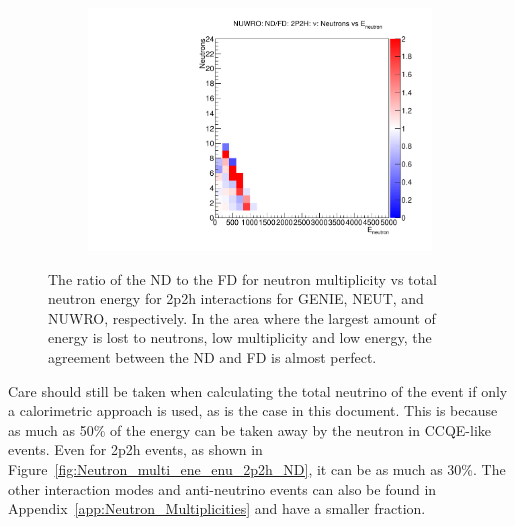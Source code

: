 \documentclass[12pt]{article}
\begin{document}
\begin{figure}
\begin{subfigure}[b]{0.32\textwidth}
  \includegraphics[width=\textwidth]{nneutrons_v_total_ene/Nneutrons_Total_ENe_2p2h_NUWRO_ND_FD_numu_norm.pdf}
\end{subfigure}
\caption{The ratio of the ND to the FD for neutron multiplicity vs total neutron energy for 2p2h interactions for GENIE, NEUT, and NUWRO, respectively.  In the area where the largest amount of energy is lost to neutrons, low multiplicity and low energy, the agreement between the ND and FD is almost perfect.} 
\label{fig:Neutron_multi_2p2h_ND_FD}
\end{figure}

Care should still be taken when calculating the total neutrino of the event if only a calorimetric approach is used, as is the case in this document.
This is because as much as 50\% of the energy can be taken away by the neutron in CCQE-like events.
Even for 2p2h events, as shown in Figure~\ref{fig:Neutron_multi_ene_enu_2p2h_ND}, it can be as much as 30\%.
The other interaction modes and anti-neutrino events can also be found in Appendix~\ref{app:Neutron_Multiplicities} and have a smaller fraction.
\end{document}
